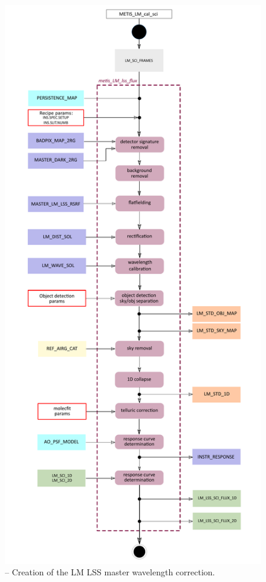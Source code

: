 \begin{figure}[ht]
  \centering
  \includegraphics[height=0.95\textheight]{figures/metis_lm_lss_flux_v0.62.pdf}
  \caption[Recipe: ]{ --
    Creation of the LM LSS master wavelength correction.}
  \label{Fig:rec_lm_lss_wave}
\end{figure}
\clearpage
